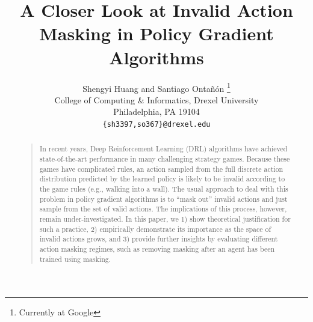 \documentclass[letterpaper]{article}
\begin{document}
%
\title{A Closer Look at Invalid Action Masking in Policy Gradient Algorithms}

\author{Shengyi Huang \textnormal{and} Santiago Onta\~{n}\'{o}n \thanks{Currently at Google} \\
College of Computing \& Informatics,
Drexel University\\
Philadelphia, PA 19104 \\
\texttt{\{sh3397,so367\}@drexel.edu}
}

\maketitle
\begin{abstract}
\begin{quote}
In recent years, Deep Reinforcement Learning (DRL) algorithms have achieved state-of-the-art performance in many challenging strategy games. Because these games have complicated rules, an action sampled from the full discrete action distribution predicted by the learned policy is likely to be invalid according to the game rules (e.g., walking into a wall). The usual approach to deal with this problem in policy gradient algorithms is to ``mask out'' invalid actions and just sample from the set of valid actions. The implications of this process, however, remain under-investigated.
In this paper, we 1) show theoretical justification for such a practice, 2) empirically demonstrate its importance as the space of invalid actions grows, and 3) provide further insights by evaluating different action masking regimes, such as removing masking after an agent has been trained using masking.
\end{quote}
\end{abstract}
\end{document}
